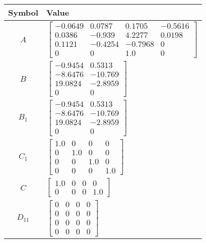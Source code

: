 \begin{tabular}{cl}
\hline
  Symbol  & Value                                                                                                                                                            \\
\hline
   $A$    & $\left[\begin{matrix}-0.0649 & 0.0787 & 0.1705 & -0.5616\\0.0386 & -0.939 & 4.2277 & 0.0198\\0.1121 & -0.4254 & -0.7968 & 0\\0 & 0 & 1.0 & 0\end{matrix}\right]$ \\
   $B$    & $\left[\begin{matrix}-0.9454 & 0.5313\\-8.6476 & -10.769\\19.0824 & -2.8959\\0 & 0\end{matrix}\right]$                                                           \\
 $B_{1}$  & $\left[\begin{matrix}-0.9454 & 0.5313\\-8.6476 & -10.769\\19.0824 & -2.8959\\0 & 0\end{matrix}\right]$                                                           \\
 $C_{1}$  & $\left[\begin{matrix}1.0 & 0 & 0 & 0\\0 & 1.0 & 0 & 0\\0 & 0 & 1.0 & 0\\0 & 0 & 0 & 1.0\end{matrix}\right]$                                                      \\
   $C$    & $\left[\begin{matrix}1.0 & 0 & 0 & 0\\0 & 0 & 0 & 1.0\end{matrix}\right]$                                                                                        \\
 $D_{11}$ & $\left[\begin{matrix}0 & 0 & 0 & 0\\0 & 0 & 0 & 0\\0 & 0 & 0 & 0\\0 & 0 & 0 & 0\end{matrix}\right]$                                                              \\

\end{tabular}
